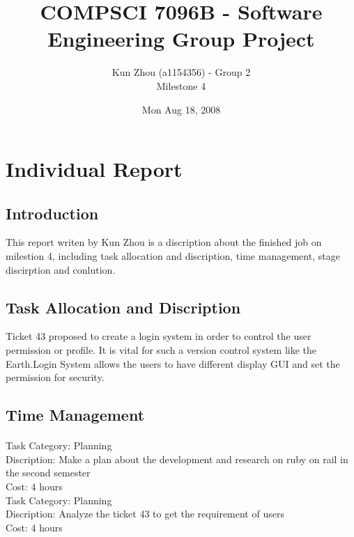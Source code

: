 \documentclass[10pt,a4,oneside]{article}
\begin{document}
\title{COMPSCI 7096B - Software Engineering Group Project}
\author{Kun Zhou (a1154356) - Group 2\\ Milestone 4}
\date{Mon Aug 18, 2008}

\maketitle

\section*{Individual Report}


\subsection*{Introduction}

This report writen by Kun Zhou is a discription about the finished job on milestion 4, including task allocation and discription, time management, stage discirption and conlution. 


\paragraph{}

\subsection*{Task Allocation and Discription}

Ticket 43 proposed to create a login system in order to control the user permission or profile. It is vital for such a version control system like the Earth.Login System allows the users to have different display GUI and set the permission for security.


\subsection*{Time Management}

\paragraph{}
Task Category: Planning  \\
Discription: Make a plan about the development and research on ruby on rail in the second semester \\
Cost: 4 hours\\


Task Category: Planning\\
Discription: Analyze the ticket 43 to get the requirement of users  \\
Cost: 4 hours\\ 
\end{document}
